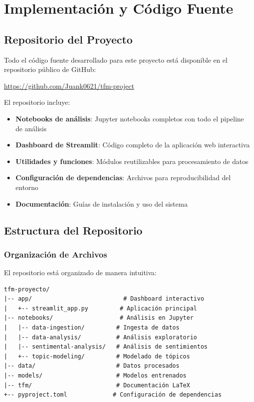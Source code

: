 \documentclass[12pt,a4paper,twoside,openany]{book}
\begin{document}
\chapter{Implementación y Código Fuente}

\section{Repositorio del Proyecto}

Todo el código fuente desarrollado para este proyecto está disponible en el repositorio público de GitHub:

\begin{center}
\url{https://github.com/Juank0621/tfm-project}
\end{center}

El repositorio incluye:

\begin{itemize}
    \item \textbf{Notebooks de análisis}: Jupyter notebooks completos con todo el pipeline de análisis
    \item \textbf{Dashboard de Streamlit}: Código completo de la aplicación web interactiva
    \item \textbf{Utilidades y funciones}: Módulos reutilizables para procesamiento de datos
    \item \textbf{Configuración de dependencias}: Archivos para reproducibilidad del entorno
    \item \textbf{Documentación}: Guías de instalación y uso del sistema
\end{itemize}

\section{Estructura del Repositorio}

\subsection{Organización de Archivos}

El repositorio está organizado de manera intuitiva:

\begin{verbatim}
tfm-proyecto/
|-- app/                          # Dashboard interactivo
|   +-- streamlit_app.py         # Aplicación principal
|-- notebooks/                   # Análisis en Jupyter
|   |-- data-ingestion/         # Ingesta de datos
|   |-- data-analysis/          # Análisis exploratorio
|   |-- sentimental-analysis/   # Análisis de sentimientos
|   +-- topic-modeling/         # Modelado de tópicos
|-- data/                       # Datos procesados
|-- models/                     # Modelos entrenados
|-- tfm/                        # Documentación LaTeX
+-- pyproject.toml             # Configuración de dependencias
\end{verbatim}
\end{document}
